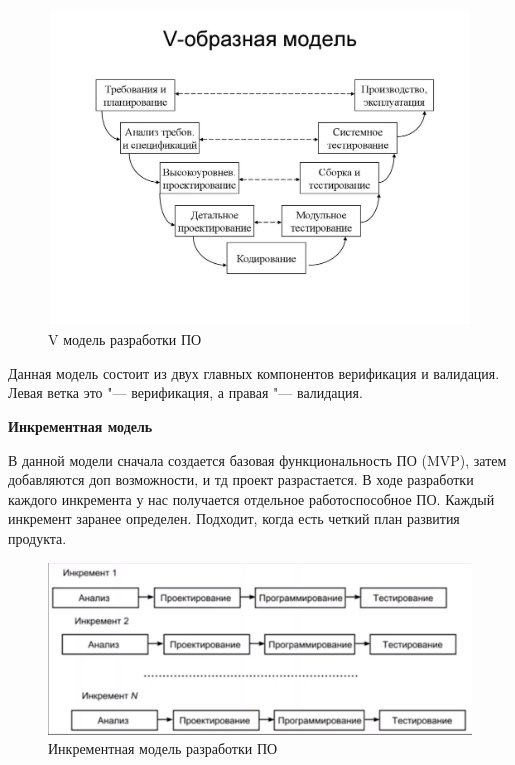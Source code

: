 \documentclass[bachelor, och, pract]{SCWorks}
\theoremstyle{remark}
\begin{document}
    \begin{figure}[H]
        \begin{center}
            \includegraphics[scale=0.8]{res/v-model.png}
            \caption{V модель разработки ПО}
        \end{center}
    \end{figure}

    Данная модель состоит из двух главных компонентов верификация и валидация. Левая ветка это "--- верификация, а правая "--- валидация.


    \begin{center}
        \textbf{Инкрементная модель}    
    \end{center}

    В данной модели сначала создается базовая функциональность ПО (MVP), затем добавляются доп возможности, и тд проект разрастается. В ходе разработки каждого инкремента у нас получается отдельное работоспособное ПО. Каждый инкремент заранее определен. Подходит, когда есть четкий план развития продукта.

    \begin{figure}[H]
        \begin{center}
            \includegraphics[scale=0.4]{res/increment.png}
            \caption{Инкрементная модель разработки ПО}
        \end{center}
    \end{figure}
\end{document}
